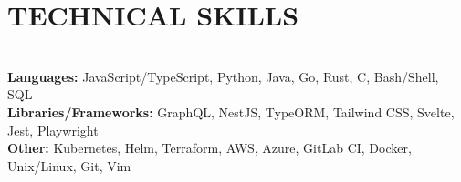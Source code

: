 \documentclass[12pt,letterpaper,roman]{moderncv}
\def \scaleFont {1.00} %
\def \headingSpace {-8mm * \real{\scaleFont}} %
\def \skillSpacing {1mm} %
\begin{document}
{\section{TECHNICAL SKILLS} \leavevmode \\[\headingSpace]
{
\textbf{Languages:}
JavaScript/TypeScript,\hspace*{\skillSpacing}
Python,\hspace*{\skillSpacing}
Java,\hspace*{\skillSpacing}
Go,\hspace*{\skillSpacing}
Rust,\hspace*{\skillSpacing}
C,\hspace*{\skillSpacing}
Bash/Shell,\hspace*{\skillSpacing}
SQL\hspace*{\skillSpacing}
\\[-0.5mm]
\textbf{Libraries/Frameworks:}
GraphQL,\hspace*{\skillSpacing}
NestJS,\hspace*{\skillSpacing}
TypeORM,\hspace*{\skillSpacing}
Tailwind CSS,\hspace*{\skillSpacing}
Svelte,\hspace*{\skillSpacing}
Jest,\hspace*{\skillSpacing}
Playwright
\\[-0.5mm]
\textbf{Other:}
Kubernetes,\hspace*{\skillSpacing}
Helm,\hspace*{\skillSpacing}
Terraform,\hspace*{\skillSpacing}
AWS,\hspace*{\skillSpacing}
Azure,\hspace*{\skillSpacing}
GitLab CI,\hspace*{\skillSpacing}
Docker,\hspace*{\skillSpacing}
Unix/Linux,\hspace*{\skillSpacing}
Git,\hspace*{\skillSpacing}
Vim\hspace*{\skillSpacing}}
}
\end{document}
